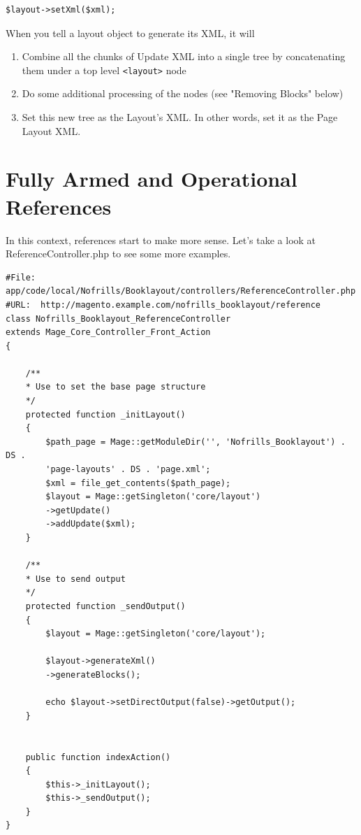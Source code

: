 \documentclass[oneside]{book}
\begin{document}
\begin{lstlisting}
$layout->setXml($xml);

\end{lstlisting}


When you tell a layout object to generate its XML, it will

\begin{enumerate}
\item Combine all the chunks of Update XML into a single tree by concatenating them under a top level \footnotesize\texttt{\textless layout\textgreater } \normalsize  node
\item Do some additional processing of the nodes (see "Removing Blocks" below)
\item Set this new tree as the Layout's XML.  In other words, set it as the Page Layout XML.
\end{enumerate}


\section{Fully Armed and Operational References}

In this context, references start to make more sense.  Let's take a look at ReferenceController.php to see some more examples.

\begin{lstlisting}
#File: app/code/local/Nofrills/Booklayout/controllers/ReferenceController.php
#URL:  http://magento.example.com/nofrills_booklayout/reference
class Nofrills_Booklayout_ReferenceController 
extends Mage_Core_Controller_Front_Action
{

    /**
    * Use to set the base page structure
    */  
    protected function _initLayout()
    {
        $path_page = Mage::getModuleDir('', 'Nofrills_Booklayout') . DS . 
        'page-layouts' . DS . 'page.xml';                   
        $xml = file_get_contents($path_page);   
        $layout = Mage::getSingleton('core/layout')
        ->getUpdate()
        ->addUpdate($xml);          
    }

    /**
    * Use to send output 
    */      
    protected function _sendOutput()
    {
        $layout = Mage::getSingleton('core/layout');

        $layout->generateXml()
        ->generateBlocks();

        echo $layout->setDirectOutput(false)->getOutput();
    }


    public function indexAction()
    {
        $this->_initLayout();
        $this->_sendOutput();
    }
}

\end{lstlisting}
\end{document}
